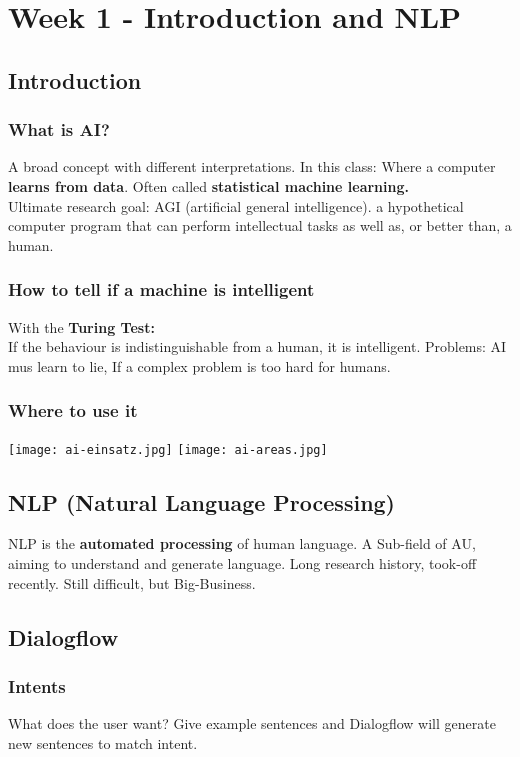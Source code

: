 \section{Week 1 - Introduction and NLP}
\subsection{Introduction}
\subsubsection{What is AI?}
A broad concept with different interpretations.
In this class: Where a computer \textbf{learns from data}.
Often called \textbf{statistical machine learning.}\\
Ultimate research goal: AGI (artificial general intelligence).
a hypothetical computer program that can perform intellectual tasks as well as, or better than, a human.

\subsubsection{How to tell if a machine is intelligent}
With the \textbf{Turing Test:}\\
If the behaviour is indistinguishable from a human, it is intelligent.
Problems: AI mus learn to lie, If a complex problem is too hard for humans.

\subsubsection{Where to use it}
\texttt{[image: ai-einsatz.jpg]}
\texttt{[image: ai-areas.jpg]}

\subsection{NLP (Natural Language Processing)}
NLP is the \textbf{automated processing} of human language.
A Sub-field of AU, aiming to understand and generate language.
Long research history, took-off recently.
Still difficult, but Big-Business.
\subsection{Dialogflow}
\subsubsection{Intents}
What does the user want?
Give example sentences and Dialogflow will generate new sentences to match intent.

